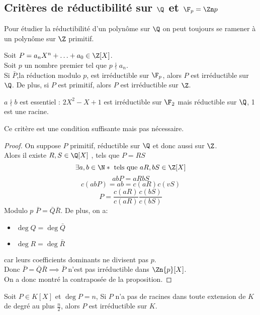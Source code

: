 \subsection{Critères de réductibilité sur $\Q$ et $\F_p = \Zn p$}
Pour étudier la réductibilité d'un polynôme sur $\Q$ on peut toujours se ramener à un
polynôme sur $\Z$ primitif.



\begin{prop}
	Soit $P = a_nX^n + \ldots + a_0 \in \Z[X]$.\\
	Soit $p$ un nombre premier tel que $p \nmid a_n$.\\
	Si $\bar{P}$,la réduction modulo $p$, est irréductible sur $\F_p$, alors $P$ est irréductible sur $\Q$.
	De plus, si $P$ est primitif, alors $P$ est irréductible sur $\Z$.
\end{prop}


\begin{remarque}
	$a \nmid b$ est essentiel : $2X^2 - X + 1$ est irréductible sur $\F_2$ mais réductible sur $\Q$, 1 est une racine.
\end{remarque}

\begin{remarque}
	Ce critère est une condition suffisante mais pas nécessaire.\\
\end{remarque}


\begin{proof}
	On suppose $P$ primitif, réductible sur $\Q$ et donc aussi sur $\Z$.\\
	Alors il existe $R, S \in \Q[X]$ , tels que $P = RS$
	$$ \exists a, b \in \N* \text{ tels que } aR, bS \in \Z[X]$$
	$$ abP = aRbS$$
	$$ c(abP) = ab = c(aR)c(vS) $$
	$$P =   \frac{c(aR)}{c(aR)} \frac{c(bS)}{c(bS)}$$
	Modulo $p$ $\bar{P} = \bar{Q}\bar{R}$.
	De plus, on a:
	\begin{itemize}
		\item $\deg Q = \deg \bar{Q}$
		\item $\deg R = \deg \bar{R}$

	\end{itemize}
	car leurs coefficients dominants ne divisent pas $p$.\\
	Donc $\bar{P} = \bar{Q}\bar{R} \implies \bar{P}$ n'est pas irréductible dans $\Zn{p}[X]$.\\
	On a donc montré la contraposée de la proposition.
\end{proof}


\begin{prop}
	Soit $P \in K[X]$ et $\deg P = n$, Si $P$ n'a pas de racines dans toute extension
	de $K$ de degré au plus $\frac{n}{2}$, alors $P$ est irréductible sur $K$.
\end{prop}

